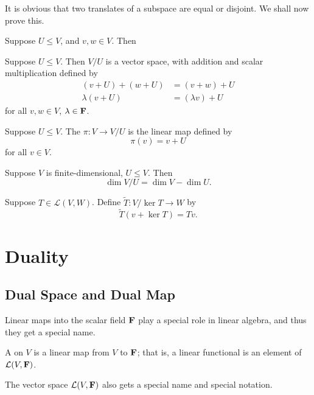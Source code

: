 It is obvious that two translates of a subspace are equal or disjoint. We shall now prove this.

\begin{proposition}
Suppose $U\le V$, and $v,w\in V$. Then
\end{proposition}

\begin{proposition}
Suppose $U\le V$. Then $V/U$ is a vector space, with addition and scalar multiplication defined by
\begin{align*}
(v+U)+(w+U)&=(v+w)+U\\
\lambda(v+U)&=(\lambda v)+U
\end{align*}
for all $v,w\in V$, $\lambda\in\mathbf F$.
\end{proposition}

\begin{definition}
Suppose $U\le V$. The  $\pi:V\to V/U$ is the linear map defined by
\[\pi(v)=v+U\]
for all $v\in V$.
\end{definition}

\begin{proposition}
Suppose $V$ is finite-dimensional, $U\le V$. Then
\[\dim V/U=\dim V-\dim U.\]
\end{proposition}

\begin{definition}
Suppose $T\in\mathcal{L}(V,W)$. Define $\tilde{T}:V/\ker T\to W$ by
\[\tilde{T}(v+\ker T)=Tv.\]
\end{definition}

\section{Duality}
\subsection{Dual Space and Dual Map}
Linear maps into the scalar field $\mathbf F$ play a special role in linear algebra, and thus they get a special name.

\begin{definition}
A  on $V$ is a linear map from $V$ to $\mathbf F$; that is, a linear functional is an element of $\mathcal{L}(V,\mathbf F)$.
\end{definition}

The vector space $\mathcal{L}(V,\mathbf F)$ also gets a special name and special notation.

